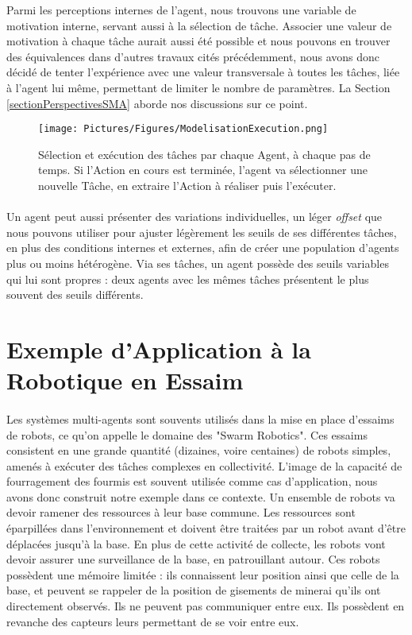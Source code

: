 		Parmi les perceptions internes de l'agent, nous trouvons une variable de motivation interne, servant aussi à la sélection de tâche. Associer une valeur de motivation à chaque tâche aurait aussi été possible et nous pouvons en trouver des équivalences dans d'autres travaux cités précédemment, nous avons donc décidé de tenter l'expérience avec une valeur transversale à toutes les tâches, liée à l'agent lui même, permettant de limiter le nombre de paramètres. La Section \ref{sectionPerspectivesSMA} aborde nos discussions sur ce point.
	
	\begin{figure}
	\centering
	\texttt{[image: Pictures/Figures/ModelisationExecution.png]}
	\caption[Sélection et exécution des tâches par chaque Agent, à chaque pas de temps.]{Sélection et exécution des tâches par chaque Agent, à chaque pas de temps. Si l'Action en cours est terminée, l'agent va sélectionner une nouvelle Tâche, en extraire l'Action à réaliser puis l'exécuter.}
	\label{agentExec}
	\end{figure}	
		
		\paragraph{}
		Un agent peut aussi présenter des variations individuelles, un léger \textit{offset} que nous pouvons utiliser pour ajuster légèrement les seuils de ses différentes tâches, en plus des conditions internes et externes, afin de créer une population d'agents plus ou moins hétérogène. Via ses tâches, un agent possède des seuils variables qui lui sont propres : deux agents avec les mêmes tâches présentent le plus souvent des seuils différents.
		
	\section{Exemple d'Application à la Robotique en Essaim}
	
		\paragraph{}
			Les systèmes multi-agents sont souvents utilisés dans la mise en place d'essaims de robots, ce qu'on appelle le domaine des "Swarm Robotics". Ces essaims consistent en une grande quantité (dizaines, voire centaines) de robots simples, amenés à exécuter des tâches complexes en collectivité. L'image de la capacité de fourragement des fourmis est souvent utilisée comme cas d'application, nous avons donc construit notre exemple dans ce contexte. Un ensemble de robots va devoir ramener des ressources à leur base commune. Les ressources sont éparpillées dans l'environnement et doivent être traitées par un robot avant d'être déplacées jusqu'à la base. En plus de cette activité de collecte, les robots vont devoir assurer une surveillance de la base, en patrouillant autour. Ces robots possèdent une mémoire limitée : ils connaissent leur position ainsi que celle de la base, et peuvent se rappeler de la position de gisements de minerai qu'ils ont directement observés. Ils ne peuvent pas communiquer entre eux. Ils possèdent en revanche des capteurs leurs permettant de se voir entre eux.
			
